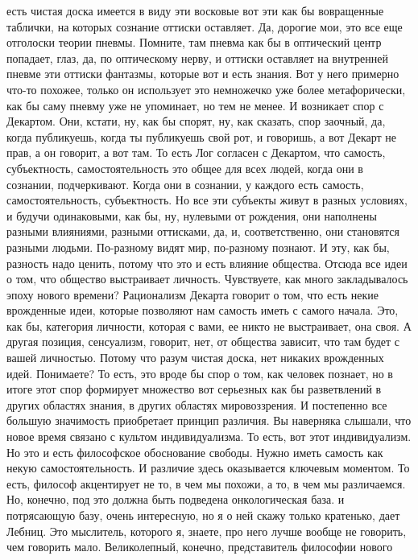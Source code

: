 есть чистая доска имеется в виду эти восковые вот эти как бы вовращенные
таблички, на которых сознание оттиски оставляет. Да, дорогие мои, это все еще
отголоски теории пневмы. Помните, там пневма как бы в оптический центр попадает,
глаз, да, по оптическому нерву, и оттиски оставляет на внутренней пневме эти
оттиски фантазмы, которые вот и есть знания. Вот у него примерно что-то похожее,
только он использует это немножечко уже более метафорически, как бы саму пневму
уже не упоминает, но тем не менее. И возникает спор с Декартом. Они, кстати, ну,
как бы спорят, ну, как сказать, спор заочный, да, когда публикуешь, когда ты
публикуешь свой рот, и говоришь, а вот Декарт не прав, а он говорит, а вот там.
То есть Лог согласен с Декартом, что самость, субъектность, самостоятельность
это общее для всех людей, когда они в сознании, подчеркивают. Когда они в
сознании, у каждого есть самость, самостоятельность, субъектность. Но все эти
субъекты живут в разных условиях, и будучи одинаковыми, как бы, ну, нулевыми от
рождения, они наполнены разными влияниями, разными оттисками, да, и,
соответственно, они становятся разными людьми. По-разному видят мир, по-разному
познают. И эту, как бы, разность надо ценить, потому что это и есть влияние
общества. Отсюда все идеи о том, что общество выстраивает личность. Чувствуете,
как много закладывалось эпоху нового времени? Рационализм Декарта говорит о том,
что есть некие врожденные идеи, которые позволяют нам самость иметь с самого
начала. Это, как бы, категория личности, которая с вами, ее никто не
выстраивает, она своя. А другая позиция, сенсуализм, говорит, нет, от общества
зависит, что там будет с вашей личностью. Потому что разум чистая доска, нет
никаких врожденных идей. Понимаете? То есть, это вроде бы спор о том, как
человек познает, но в итоге этот спор формирует множество вот серьезных как бы
разветвлений в других областях знания, в других областях мировоззрения. И
постепенно все большую значимость приобретает принцип различия. Вы наверняка
слышали, что новое время связано с культом индивидуализма. То есть, вот этот
индивидуализм. Но это и есть философское обоснование свободы. Нужно иметь
самость как некую самостоятельность. И различие здесь оказывается ключевым
моментом. То есть, философ акцентирует не то, в чем мы похожи, а то, в чем мы
различаемся. Но, конечно, под это должна быть подведена онкологическая база. и
потрясающую базу, очень интересную, но я о ней скажу только кратенько, дает
Лебниц. Это мыслитель, которого я, знаете, про него лучше вообще не говорить,
чем говорить мало. Великолепный, конечно, представитель философии нового
